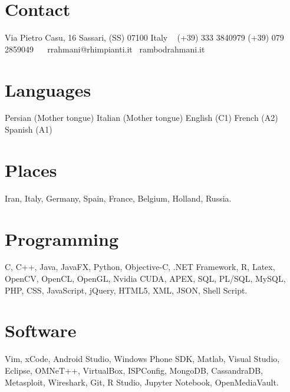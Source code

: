 \documentclass[]{friggeri-cv}
\begin{document}


\begin{aside}
\section{Contact}
Via Pietro Casu, 16
Sassari, (SS) 07100
Italy
~
(+39) 333 3840979
(+39) 079 2859049
~
\small{{\faEnvelope}~{rrahmani@rhimpianti.it}}
\small{{\faGlobe}~{rambodrahmani.it}}\vspace{6mm}
\section{Languages}
Persian (Mother tongue)
Italian (Mother tongue)
English (C1)
French (A2)
Spanish (A1)\vspace{6mm}
\section{Places \textcolor{light-blue}{\faMapMarker}}
Iran, Italy, Germany, Spain, France, Belgium, Holland, Russia.\vspace{6mm}
\section{Programming \small{\textcolor{magenta}{{\faHeart}}}}
C, C++, Java, JavaFX, Python, Objective-C, .NET Framework, R, Latex, OpenCV, OpenCL, OpenGL, Nvidia CUDA, APEX, SQL, PL/SQL, MySQL, PHP, CSS, JavaScript, jQuery, HTML5, XML, JSON, Shell Script.\vspace{6mm}
\section{Software}
Vim, xCode, Android Studio, Windows Phone SDK, Matlab, Visual Studio, Eclipse, OMNeT++, VirtualBox, ISPConfig, MongoDB, CassandraDB, Metasploit, Wireshark, Git, R Studio, Jupyter Notebook, OpenMediaVault.\vspace{6mm}
\end{aside}

\end{document}
